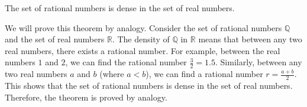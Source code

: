 The set of rational numbers is dense in the set of real numbers.

We will prove this theorem by analogy.
\newline	
Consider the set of rational numbers \( \mathbb{Q} \) and the set of real numbers \( \mathbb{R} \). The density of \( \mathbb{Q} \) in \( \mathbb{R} \) means that between any two real numbers, there exists a rational number.
For example, between the real numbers \( 1 \) and \( 2 \), we can find the rational number \( \frac{3}{2} = 1.5 \). Similarly, between any two real numbers \( a \) and \( b \) (where \( a < b \)), we can find a rational number \( r = \frac{a + b}{2} \).
\newline
This shows that the set of rational numbers is dense in the set of real numbers.
Therefore, the theorem is proved by analogy.

\QED


